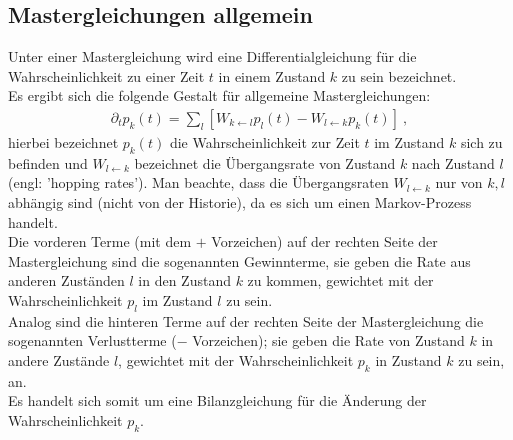 \documentclass[a4paper, 12pt]{report}
\begin{document}
\subsection{Mastergleichungen allgemein}
Unter einer Mastergleichung wird eine Differentialgleichung für die Wahrscheinlichkeit zu einer Zeit $t$ in einem Zustand $k$ zu sein bezeichnet.
\\
Es ergibt sich die folgende Gestalt für allgemeine Mastergleichungen:
\begin{align}
\partial_t p_k(t) = \sum_{l} \left[ W_{k \leftarrow l}p_l(t) - W_{l \leftarrow k}p_k(t)\right]\ ,
\end{align}
hierbei bezeichnet $p_k(t)$ die Wahrscheinlichkeit zur Zeit $t$ im Zustand $k$ sich zu befinden und $W_{l \leftarrow k}$ bezeichnet die Übergangsrate von Zustand $k$ nach Zustand $l$ (engl: 'hopping rates'). Man beachte, dass die Übergangsraten $W_{l \leftarrow k}$ nur von $k,l$ abhängig sind (nicht von der Historie), da es sich um einen Markov-Prozess handelt.
\\
Die vorderen Terme (mit dem $+$ Vorzeichen) auf der rechten Seite der Mastergleichung sind die sogenannten Gewinnterme, sie geben die Rate aus anderen Zuständen $l$ in den Zustand $k$ zu kommen, gewichtet mit der Wahrscheinlichkeit $p_l$ im Zustand $l$ zu sein.
\\
Analog sind die hinteren Terme auf der rechten Seite der Mastergleichung die sogenannten Verlustterme ($-$ Vorzeichen); sie geben die Rate von Zustand $k$ in andere Zustände $l$, gewichtet mit der Wahrscheinlichkeit $p_k$ in Zustand $k$ zu sein, an.
\\
Es handelt sich somit um eine Bilanzgleichung für die Änderung der Wahrscheinlichkeit $p_k$.
\end{document}

